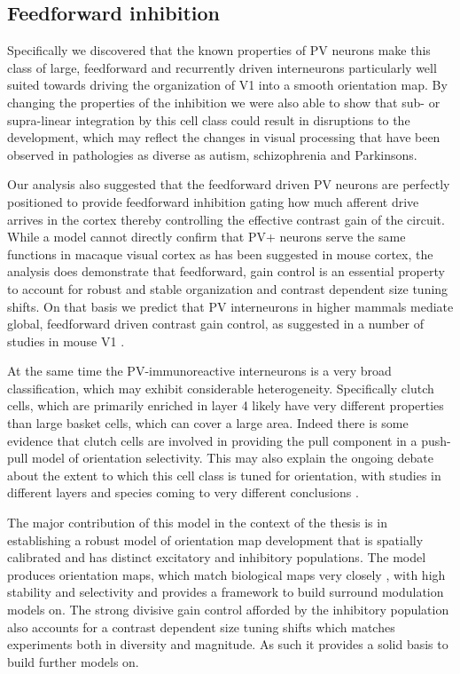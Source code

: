 \subsection{Feedforward inhibition}

Specifically we discovered that the known properties of PV neurons
make this class of large, feedforward and recurrently driven
interneurons particularly well suited towards driving the organization
of V1 into a smooth orientation map. By changing the properties of the
inhibition we were also able to show that sub- or supra-linear
integration by this cell class could result in disruptions to the
development, which may reflect the changes in visual processing that
have been observed in pathologies as diverse as autism, schizophrenia
and Parkinsons.

Our analysis also suggested that the feedforward driven PV neurons are
perfectly positioned to provide feedforward inhibition gating how much
afferent drive arrives in the cortex thereby controlling the effective
contrast gain of the circuit. While a model cannot directly confirm
that PV+ neurons serve the same functions in macaque visual cortex as
has been suggested in mouse cortex, the analysis does demonstrate that
feedforward, gain control is an essential property to account for
robust and stable organization and contrast dependent size tuning
shifts. On that basis we predict that PV interneurons in higher
mammals mediate global, feedforward driven contrast gain control, as
suggested in a number of studies in mouse V1 \citep{Ma2010,
  Atallah2012, Wilson2012, Nienborg2013}.

At the same time the PV-immunoreactive interneurons is a very broad
classification, which may exhibit considerable
heterogeneity. Specifically clutch cells, which are primarily enriched
in layer 4 likely have very different properties than large basket
cells, which can cover a large area. Indeed there is some evidence
that clutch cells are involved in providing the pull component in a
push-pull model of orientation selectivity. This may also explain the
ongoing debate about the extent to which this cell class is tuned for
orientation, with studies in different layers and species coming to
very different conclusions \citep{Cardin2007, Ma2011, Hofer2011}.

The major contribution of this model in the context of the thesis is
in establishing a robust model of orientation map development that is
spatially calibrated and has distinct excitatory and inhibitory
populations. The model produces orientation maps, which match
biological maps very closely \citep{Kaschube2010, Stevens2013b}, with
high stability and selectivity and provides a framework to build
surround modulation models on. The strong divisive gain control
afforded by the inhibitory population also accounts for a contrast
dependent size tuning shifts which matches experiments both in
diversity and magnitude. As such it provides a solid basis to build
further models on.

